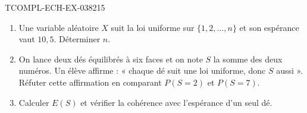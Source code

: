 \begin{exercice}{TCOMPL-ECH-EX-038}{2}{15}
\begin{enumerate}
  \item Une variable aléatoire $X$ suit la loi uniforme sur $\{1,2,\ldots,n\}$ et son espérance vaut $10{,}5$. Déterminer $n$.
  \item On lance deux dés équilibrés à six faces et on note $S$ la somme des deux numéros. Un élève affirme : « chaque dé suit une loi uniforme, donc $S$ aussi ». Réfuter cette affirmation en comparant $P(S=2)$ et $P(S=7)$.
  \item Calculer $E(S)$ et vérifier la cohérence avec l'espérance d'un seul dé.
\end{enumerate}
\end{exercice}
